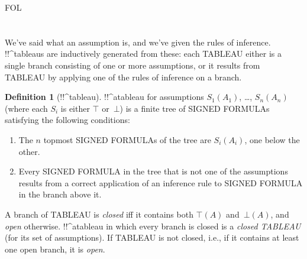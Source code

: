 \documentclass[10pt,a4paper]{article}
\newcommand*{\olup}[1]{\MakeUppercase{#1}}
\theoremstyle{plain}
\theoremstyle{definition}
\newtheorem{defn}[thm]{Definition}
\theoremstyle{remark}
\newenvironment{explain}{}{}
\newcommand*{\olfileid}[3]{}
\newcommand*{\olsection}[1]{\section*{#1}}
\providecommand{\sFmla}[2]{#1(#2)}
\providecommand{\True}{\top}
\providecommand{\False}{\bot}
\providecommand{\iftag}[1]{#1}
\providecommand{\iftag}{}
\begin{document}



\iftag{FOL}
      {\olfileid{fol}{tab}{der}}
      {\olfileid{pl}{tab}{der}}

\olsection{}

\begin{explain}
We've said what an assumption is, and we've given the rules of
inference.  !!^{tableau}s are inductively generated from these: each
\olup{tableau} either is a single branch consisting of one or more
assumptions, or it results from \olup{tableau} by applying one of the
rules of inference on a branch.
\end{explain}

\begin{defn}[!!^{tableau}]
!!^a{tableau} for assumptions $\sFmla{S_1}{A_1}$, \dots,
$\sFmla{S_n}{A_n}$ (where each $S_i$ is either $\True$ or~$\False$) is
a finite tree of \olup{signed formula}s satisfying the following conditions:
\begin{enumerate}
\item The $n$ topmost \olup{signed formula}s of the tree are
  $\sFmla{S_i}{A_i}$, one below the other.
\item Every \olup{signed formula} in the tree that is not one of the
  assumptions results from a correct application of an inference rule
  to \olup{signed formula} in the branch above it.
\end{enumerate}
A branch of \olup{tableau} is \emph{closed} iff it contains both
$\sFmla{\True}{A}$ and~$\sFmla{\False}{A}$, and \emph{open}
otherwise. !!^a{tableau} in which every branch is closed is a
\emph{closed \olup{tableau}} (for its set of assumptions). If \olup{tableau} is
not closed, i.e., if it contains at least one open branch, it is
\emph{open}.
\end{defn}
\end{document}
